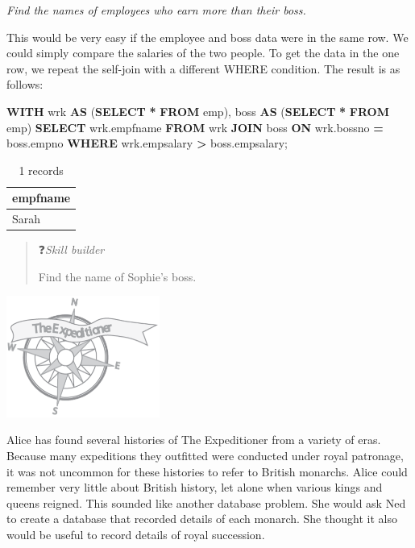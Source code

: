 \documentclass[
]{article}
\newenvironment{Shaded}{\begin{snugshade}}{\end{snugshade}}
\newcommand{\KeywordTok}[1]{\textcolor[rgb]{0.13,0.29,0.53}{\textbf{#1}}}
\newcommand{\NormalTok}[1]{#1}
\newcommand{\OperatorTok}[1]{\textcolor[rgb]{0.81,0.36,0.00}{\textbf{#1}}}
\begin{document}
\emph{Find the names of employees who earn more than their boss.}

This would be very easy if the employee and boss data were in the same
row. We could simply compare the salaries of the two people. To get the
data in the one row, we repeat the self-join with a different WHERE
condition. The result is as follows:

\begin{Shaded}
\begin{Highlighting}[]
\KeywordTok{WITH}
\NormalTok{wrk }\KeywordTok{AS}\NormalTok{ (}\KeywordTok{SELECT} \OperatorTok{*} \KeywordTok{FROM}\NormalTok{ emp), }
\NormalTok{boss }\KeywordTok{AS}\NormalTok{ (}\KeywordTok{SELECT} \OperatorTok{*} \KeywordTok{FROM}\NormalTok{ emp) }
\KeywordTok{SELECT}\NormalTok{ wrk.empfname }\KeywordTok{FROM}\NormalTok{ wrk }\KeywordTok{JOIN}\NormalTok{ boss }
        \KeywordTok{ON}\NormalTok{ wrk.bossno }\OperatorTok{=}\NormalTok{ boss.empno}
        \KeywordTok{WHERE}\NormalTok{ wrk.empsalary }\OperatorTok{\textgreater{}}\NormalTok{ boss.empsalary;}
\end{Highlighting}
\end{Shaded}

\begin{table}

\caption{\label{tab:unnamed-chunk-80}1 records}
\centering
\begin{tabular}[t]{l}
\hline
empfname\\
\hline
Sarah\\
\hline
\end{tabular}
\end{table}

\begin{quote}
❓\emph{Skill builder}

Find the name of Sophie's boss.
\end{quote}

\includegraphics[width=1.97917in,height=\textheight]{Figures/Chapter 1/expeditioner.png}

Alice has found several histories of The Expeditioner from a variety of
eras. Because many expeditions they outfitted were conducted under royal
patronage, it was not uncommon for these histories to refer to British
monarchs. Alice could remember very little about British history, let
alone when various kings and queens reigned. This sounded like another
database problem. She would ask Ned to create a database that recorded
details of each monarch. She thought it also would be useful to record
details of royal succession.
\end{document}
